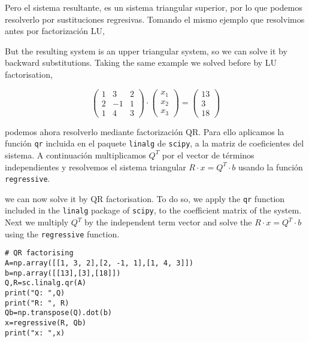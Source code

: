 \begin{paracol}{2}
Pero el sistema resultante, es un sistema triangular superior, por lo que podemos resolverlo por sustituciones regresivas. Tomando el mismo ejemplo que resolvimos antes por factorización LU,

\switchcolumn

But the resulting system is an upper triangular system, so we can solve it by backward substitutions. Taking the same example we solved before by LU factorisation,

\end{paracol}
\begin{equation*}
\begin{pmatrix}
1& 3& 2\\
2& -1& 1\\
1& 4& 3
\end{pmatrix}\cdot \begin{pmatrix}
x_1\\
x_2\\
x_3
\end{pmatrix}=\begin{pmatrix}
13\\
3\\
18
\end{pmatrix}
\end{equation*}

\begin{paracol}{2}
podemos ahora resolverlo mediante factorización QR. Para ello aplicamos la función \texttt{qr} incluida en el paquete \texttt{linalg} de \texttt{scipy}, a la matriz de coeficientes del sistema. A continuación multiplicamos $Q^T$ por el vector de términos independientes y resolvemos el sistema triangular $R \cdot x = Q^T \cdot b$ usando la función \texttt{regressive}.


\switchcolumn
we can now solve it by QR factorisation. To do so, we apply the \texttt{qr} function included in the \texttt{linalg} package of \texttt{scipy}, to the coefficient matrix of the system. Next we multiply $Q^T$ by the independent term vector and solve the $R\cdot x = Q^T \cdot b$ using the \texttt{regressive} function.

\end{paracol}
\begin{verbatim}
# QR factorising
A=np.array([[1, 3, 2],[2, -1, 1],[1, 4, 3]])
b=np.array([[13],[3],[18]])
Q,R=sc.linalg.qr(A)
print("Q: ",Q)
print("R: ", R)
Qb=np.transpose(Q).dot(b)
x=regressive(R, Qb)
print("x: ",x)    
\end{verbatim}

